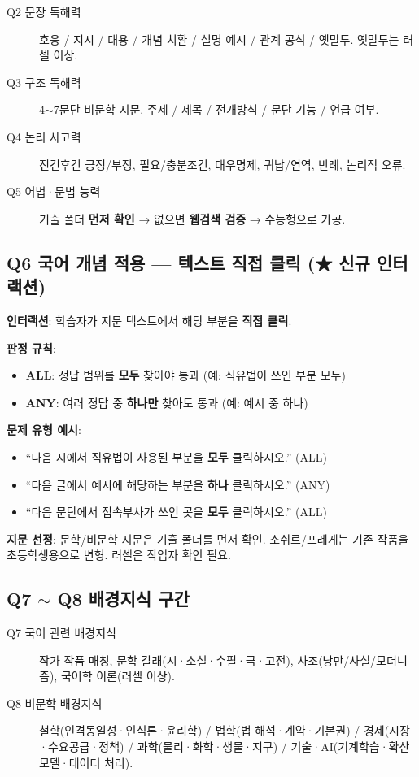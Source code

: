\documentclass[11pt,a4paper]{article}
\begin{document}
\begin{description}
  \item[Q2 문장 독해력] 호응 / 지시 / 대용 / 개념 치환 / 설명-예시 / 관계 공식 / 옛말투. 옛말투는 러셀 이상.
  \item[Q3 구조 독해력] 4$\sim$7문단 비문학 지문. 주제 / 제목 / 전개방식 / 문단 기능 / 언급 여부.
  \item[Q4 논리 사고력] 전건후건 긍정/부정, 필요/충분조건, 대우명제, 귀납/연역, 반례, 논리적 오류.
  \item[Q5 어법·문법 능력] 기출 폴더 \textbf{먼저 확인} → 없으면 \textbf{웹검색 검증} → 수능형으로 가공.
\end{description}

\subsection{Q6 국어 개념 적용 — 텍스트 직접 클릭 (★ 신규 인터랙션)}

\textbf{인터랙션}: 학습자가 지문 텍스트에서 해당 부분을 \textbf{직접 클릭}.

\textbf{판정 규칙}:
\begin{itemize}
  \item \textbf{ALL}: 정답 범위를 \textbf{모두} 찾아야 통과 (예: 직유법이 쓰인 부분 모두)
  \item \textbf{ANY}: 여러 정답 중 \textbf{하나만} 찾아도 통과 (예: 예시 중 하나)
\end{itemize}

\textbf{문제 유형 예시}:
\begin{itemize}
  \item ``다음 시에서 직유법이 사용된 부분을 \textbf{모두} 클릭하시오.'' (ALL)
  \item ``다음 글에서 예시에 해당하는 부분을 \textbf{하나} 클릭하시오.'' (ANY)
  \item ``다음 문단에서 접속부사가 쓰인 곳을 \textbf{모두} 클릭하시오.'' (ALL)
\end{itemize}

\textbf{지문 선정}: 문학/비문학 지문은 기출 폴더를 먼저 확인. 소쉬르/프레게는 기존 작품을 초등학생용으로 변형. 러셀은 작업자 확인 필요.

\subsection{Q7 $\sim$ Q8 배경지식 구간}

\begin{description}
  \item[Q7 국어 관련 배경지식] 작가-작품 매칭, 문학 갈래(시·소설·수필·극·고전), 사조(낭만/사실/모더니즘), 국어학 이론(러셀 이상).
  \item[Q8 비문학 배경지식] 철학(인격동일성·인식론·윤리학) / 법학(법 해석·계약·기본권) / 경제(시장·수요공급·정책) / 과학(물리·화학·생물·지구) / 기술·AI(기계학습·확산모델·데이터 처리).
\end{description}
\end{document}
